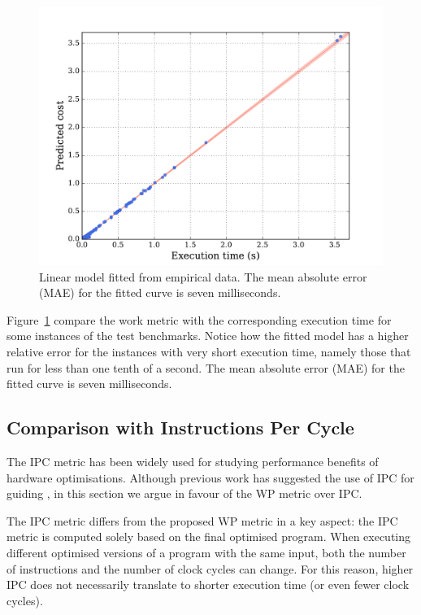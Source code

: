 \begin{figure}[htb]
    \centering
    \includegraphics[width=0.9\linewidth]{figs/cost-model.pdf}
    \caption{Linear model fitted from empirical data. The mean absolute error (MAE) for the fitted curve is seven milliseconds.}
    \label{fig:cost-model}
\end{figure}

Figure~\ref{fig:cost-model} compare the work metric with the corresponding execution time for some instances of the test benchmarks.
Notice how the fitted model has a higher relative error for the instances with very short execution time, namely those that run for less than one tenth of a second.
The mean absolute error (MAE) for the fitted curve is seven milliseconds.

\subsection{Comparison with Instructions Per Cycle} \label{sec:ipc-vs-work-metric}

The IPC metric has been widely used for studying performance benefits of hardware optimisations.
Although previous work has suggested the use of IPC for guiding {\itercomp}, in this section we argue in favour of the WP metric over IPC.

The IPC metric differs from the proposed WP metric in a key aspect:
the IPC metric is computed solely based on the final optimised program.
When executing different optimised versions of a program with the same input, both the number of instructions and the number of clock cycles can change.
For this reason, higher IPC does not necessarily translate to shorter execution time (or even fewer clock cycles).

